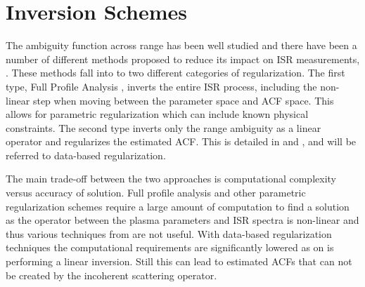 \section{Inversion Schemes}
\label{sec:isrlit}
The ambiguity function across range has been well studied and there have been a number of different methods proposed to reduce its impact on ISR measurements,
\citep{RDS:RDS3308,hysell2008,nikoukar2008,Virtanen:20082vx}. These methods fall into to two different categories of regularization. The first type, Full Profile Analysis \citep{RDS:RDS3308,hysell2008}, inverts the entire ISR process, including the non-linear step when moving between the parameter space and ACF space. This allows for parametric regularization which can include known physical constraints. The second type inverts only the range ambiguity as a linear operator and regularizes the estimated ACF. This is detailed in \citep{nikoukar2008} and \citep{Virtanen:20082vx}, and will be referred to data-based regularization.

The main trade-off between the two approaches is computational complexity versus accuracy of solution. Full profile analysis and other parametric regularization schemes require a large amount of computation to find a solution as the operator between the plasma parameters and ISR spectra is non-linear and thus various techniques from are not useful. With data-based regularization techniques the computational requirements are significantly lowered as on is performing a linear inversion. Still this can lead to estimated ACFs that can not be created by the incoherent scattering operator.

%
%


